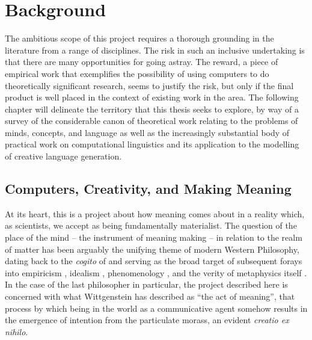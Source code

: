 \chapter{Background}
The ambitious scope of this project requires a thorough grounding in the literature from a range of disciplines.  The risk in such an inclusive undertaking is that there are many opportunities for going astray.  The reward, a piece of empirical work that exemplifies the possibility of using computers to do theoretically significant research, seems to justify the risk, but only if the final product is well placed in the context of existing work in the area.  The following chapter will delineate the territory that this thesis seeks to explore, by way of a survey of the considerable canon of theoretical work relating to the problems of minds, concepts, and language as well as the increasingly substantial body of practical work on computational linguistics and its application to the modelling of creative language generation.

\section{Computers, Creativity, and Making Meaning}
At its heart, this is a project about how meaning comes about in a reality which, as scientists, we accept as being fundamentally materialist.  The question of the place of the mind -- the instrument of meaning making -- in relation to the realm of matter has been arguably the unifying theme of modern Western Philosophy, dating back to the \emph{cogito} of \cite{Descartes} and serving as the broad target of subsequent forays into empiricism \citep{Locke,Hume}, idealism \citep{Hegel,Kant}, phenomenology \citep{Husserl,Heidegger}, and the verity of metaphysics itself \citep{Wittgenstein}.  In the case of the last philosopher in particular, the project described here is concerned with what Wittgenstein has described as ``the act of meaning'', that process by which being in the world as a communicative agent somehow results in the emergence of intention from the particulate morass, an evident \emph{creatio ex nihilo}.

